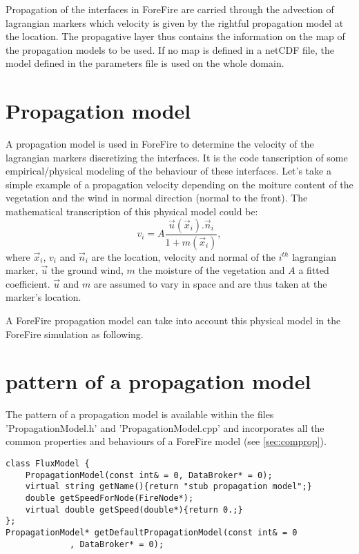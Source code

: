 Propagation of the interfaces in ForeFire are carried through the advection of lagrangian markers which velocity is given by the rightful propagation model at the location. The propagative layer thus contains the information on the map of the propagation models to be used. If no map is defined in a netCDF file, the model defined in the parameters file is used on the whole domain.

\section{Propagation model}

A propagation model is used in ForeFire to determine the velocity of the lagrangian markers discretizing the interfaces. It is the code tanscription of some empirical/physical modeling of the behaviour of these interfaces. Let's take a simple example of a propagation velocity depending on the moiture content of the vegetation and the wind in normal direction (normal to the front). The mathematical transcription of this physical model could be: \begin{equation} v_{i} = A\dfrac{\vec{u}(\vec{x}_{i}).\vec{n}_{i}}{1+m(\vec{x}_{i})}, \label{eq:prop}\end{equation} where $\vec{x}_{i}$, $v_{i}$ and $\vec{n}_{i}$ are the location, velocity and normal of the $i^{th}$ lagrangian marker, $\vec{u}$ the ground wind, $m$ the moisture of the vegetation and $A$ a fitted coefficient. $\vec{u}$ and $m$ are assumed to vary in space and are thus taken at the marker's location.

A ForeFire propagation model can take into account this physical model in the ForeFire simulation as following.

\section{pattern of a propagation model}

The pattern of a propagation model is available within the files 'PropagationModel.h' and 'PropagationModel.cpp' and incorporates all the common properties and behaviours of a ForeFire model (see \ref{sec:comprop}).
\begin{lstlisting}[caption={PropagationModel.h},frame=single]
class FluxModel {
	PropagationModel(const int& = 0, DataBroker* = 0);
	virtual string getName(){return "stub propagation model";}
	double getSpeedForNode(FireNode*);
	virtual double getSpeed(double*){return 0.;}
};
PropagationModel* getDefaultPropagationModel(const int& = 0
             , DataBroker* = 0);
\end{lstlisting}

